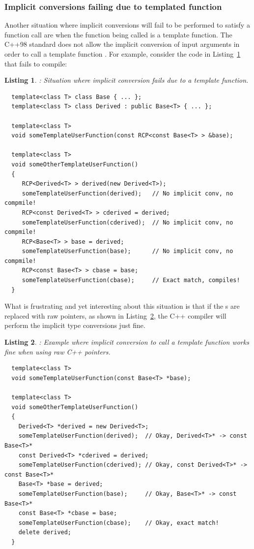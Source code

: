 \documentclass[pdf,ps2pdf,11pt]{SANDreport}
\newtheorem{listing}{Listing}
\begin{document}
%
{}\subsubsection*{Implicit conversions failing due to templated function}
%

Another situation where implicit conversions will fail to be performed
to satisfy a function call are when the function being called is a
template function.  The C++98 standard does not allow the implicit
conversion of input arguments in order to call a template function
{}\cite[Item 45]{EffectiveC++ThirdEdition}.  For example, consider the
code in Listing~\ref{listing:implicit-conv-fail-template-func} that
fails to compile:


{}\begin{listing}: Situation where implicit conversion fails due to a
template function.
\label{listing:implicit-conv-fail-template-func}
{\small\begin{verbatim}
  template<class T> class Base { ... };
  template<class T> class Derived : public Base<T> { ... };

  template<class T>
  void someTemplateUserFunction(const RCP<const Base<T> > &base);

  template<class T>
  void someOtherTemplateUserFunction()
  {
     RCP<Derived<T> > derived(new Derived<T>);
     someTemplateUserFunction(derived);   // No implicit conv, no compmile!
     RCP<const Derived<T> > cderived = derived;
     someTemplateUserFunction(cderived);  // No implicit conv, no compmile!
     RCP<Base<T> > base = derived;
     someTemplateUserFunction(base);      // No implicit conv, no compmile!
     RCP<const Base<T> > cbase = base;
     someTemplateUserFunction(cbase);     // Exact match, compiles!
  }
\end{verbatim}}
\end{listing}


What is frustrating and yet interesting about this situation is that
if the {}s are replaced with raw pointers, as shown in
Listing~\ref{listing:implicit-conv-pass-raw--template-func}, the C++
compiler will perform the implicit type conversions just fine.


{}\begin{listing}: Example where implicit conversion to call a
template function works fine when using raw C++ pointers.
\label{listing:implicit-conv-pass-raw--template-func}
{\small\begin{verbatim}
  template<class T>
  void someTemplateUserFunction(const Base<T> *base);
  
  template<class T>
  void someOtherTemplateUserFunction()
  {
    Derived<T> *derived = new Derived<T>;
    someTemplateUserFunction(derived);  // Okay, Derived<T>* -> const Base<T>*
    const Derived<T> *cderived = derived;
    someTemplateUserFunction(cderived); // Okay, const Derived<T>* -> const Base<T>*
    Base<T> *base = derived;
    someTemplateUserFunction(base);     // Okay, Base<T>* -> const Base<T>*
    const Base<T> *cbase = base;
    someTemplateUserFunction(cbase);    // Okay, exact match!
    delete derived;
  }
\end{verbatim}}
\end{listing}
\end{document}
